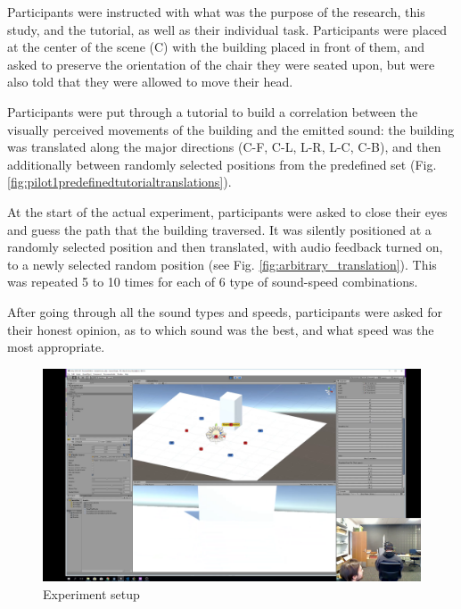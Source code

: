 Participants were instructed with what was the purpose of the research, this study, and the tutorial, as well as their individual task. Participants were placed at the center of the scene (C) with the building placed in front of them, and asked to preserve the orientation of the chair they were seated upon, but were also told that they were allowed to move their head.

Participants were put through a tutorial to build a correlation between the visually perceived movements of the building and the emitted sound: the building was translated along the major directions (C-F, C-L, L-R, L-C, C-B), and then additionally between randomly selected positions from the predefined set (Fig. \ref{fig:pilot1predefinedtutorialtranslations}).

At the start of the actual experiment, participants were asked to close their eyes and guess the path that the building traversed. It was silently positioned at a randomly selected position and then translated, with audio feedback turned on, to a newly selected random position (see Fig. \ref{fig:arbitrary_translation}). This was repeated 5 to 10 times for each of 6 type of sound-speed combinations.

After going through all the sound types and speeds, participants were asked for their honest opinion, as to which sound was the best, and what speed was the most appropriate.

\begin{figure}
	\centering
	\includegraphics[width=0.7\linewidth]{figures/placeholders/pilot1_experiment_setup.png}
	\caption{Experiment setup}
	\label{fig:clipimage001}
\end{figure}

